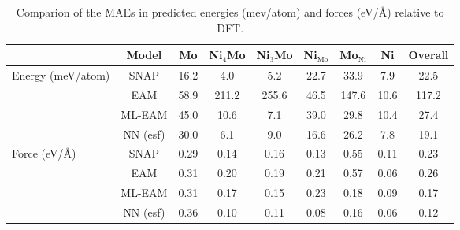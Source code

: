 \documentclass[prb,reprint]{revtex4-2}
\begin{document}
\begin{table*}[h]
\centering
\begin{tabular}{lcccccccc}
\hline
    & Model & Mo & Ni$_4$Mo & Ni$_3$Mo & Ni$_{\mathrm{Mo}}$ & Mo$_{\mathrm{Ni}}$ 
    & Ni & Overall \\
\hline
Energy (meV/atom) & SNAP & 16.2 & 4.0 & 5.2 & 22.7 & 33.9 & 7.9 & 22.5 \\
    & EAM & 58.9 & 211.2 & 255.6 & 46.5 & 147.6 & 10.6 & 117.2 \\
    & \color{red} ML-EAM & \color{red} 45.0 & \color{red} 10.6 
    & \color{red} 7.1 & \color{red} 39.0 & \color{red} 29.8 & \color{red} 10.4 
    & \color{red} 27.4 \\
    & NN (esf) & 30.0 & 6.1 & 9.0 & 16.6 & 26.2 & 7.8 & 19.1 \\
\hline
Force (eV/\AA) & SNAP & 0.29 & 0.14 & 0.16 & 0.13 & 0.55 & 0.11 & 0.23 \\
& EAM & 0.31 & 0.20 & 0.19 & 0.21 & 0.57 & 0.06 & 0.26 \\
& \color{red} ML-EAM & \color{red} 0.31 & \color{red} 0.17 & \color{red} 0.15 
& \color{red} 0.23 & \color{red} 0.18 & \color{red} 0.09 & \color{red} 0.17 \\
& NN (esf) & 0.36 & 0.10 & 0.11 & 0.08 & 0.16 & 0.06 & 0.12 \\
\hline
\end{tabular}
\caption{\label{table:MAE}
Comparion of the MAEs in predicted energies (mev/atom) and forces (eV/\AA) 
relative to DFT.}
\end{table*}
\end{document}
